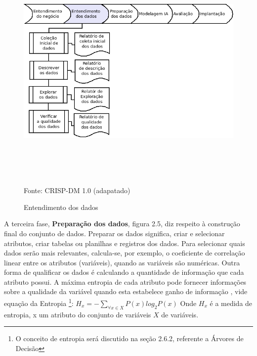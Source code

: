 \begin{figure}[!ht]
\centering
\caption{Entendimento dos dados}
\vspace{1mm}
\includegraphics[width=160mm, height=120mm]{Figuras/Cronograma/EntendDados.png}\\
\tiny Fonte: CRISP-DM 1.0 (adapatado)
\end{figure}

\pagebreak


A terceira fase, \textbf{Preparação dos dados}, figura 2.5, diz respeito à construção final do conjunto de dados. 
Preparar os dados significa, criar e selecionar atributos, criar tabelas ou planilhas e registros dos dados.
Para selecionar quais dados serão mais relevantes, calcula-se, por exemplo, o coeficiente de correlação linear entre os atributos (variáveis), quando as variáveis são numéricas. Outra forma de qualificar os dados é calculando a quantidade de informação que cada atributo possui. A máxima entropia de cada atributo pode fornecer informações sobre a qualidade da variável quando esta estabelece ganho de informação \cite{NorvigRussel2004}, vide equação da Entropia \footnote{O conceito de entropia será discutido na seção 2.6.2, referente a Árvores de Decisão}: $ H_{x}=-\sum_{\forall x \in X}P(x)log_{2}P(x) $
Onde $ H_{x} $ é a medida de entropia, x um atributo do conjunto de variáveis $X$ de variáveis. 

\vspace{0.5cm}

